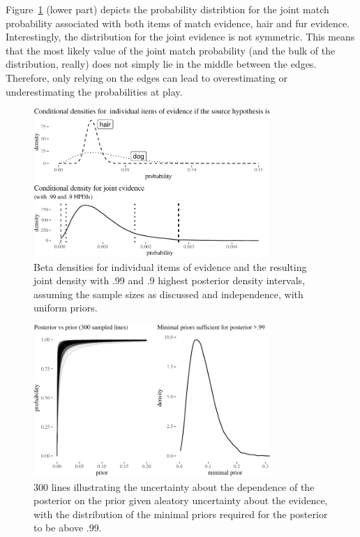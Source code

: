\documentclass[
  letterpaper,
  DIV=11,
  numbers=noendperiod]{scrartcl}
\begin{document}
Figure~\ref{fig-densities} (lower part) depicts the probability
distribtion for the joint match probability associated with both items
of match evidence, hair and fur evidence.\\
Interestingly, the distribution for the joint evidence is not symmetric.
This means that the most likely value of the joint match probability
(and the bulk of the distribution, really) does not simply lie in the
middle between the edges. Therefore, only relying on the edges can lead
to overestimating or underestimating the probabilities at play.

\begin{figure}[H]

{\centering \includegraphics[width=0.8\textwidth,height=\textheight]{imp_philosophical_backup_files/figure-pdf/fig-densities-1.pdf}

}

\caption{\label{fig-densities}Beta densities for individual items of
evidence and the resulting joint density with .99 and .9 highest
posterior density intervals, assuming the sample sizes as discussed and
independence, with uniform priors.}

\end{figure}

\begin{figure}[H]

{\centering \includegraphics[width=0.8\textwidth,height=\textheight]{imp_philosophical_backup_files/figure-pdf/fig-lines-1.pdf}

}

\caption{\label{fig-lines}300 lines illustrating the uncertainty about
the dependence of the posterior on the prior given aleatory uncertainty
about the evidence, with the distribution of the minimal priors required
for the posterior to be above .99.}

\end{figure}
\end{document}
